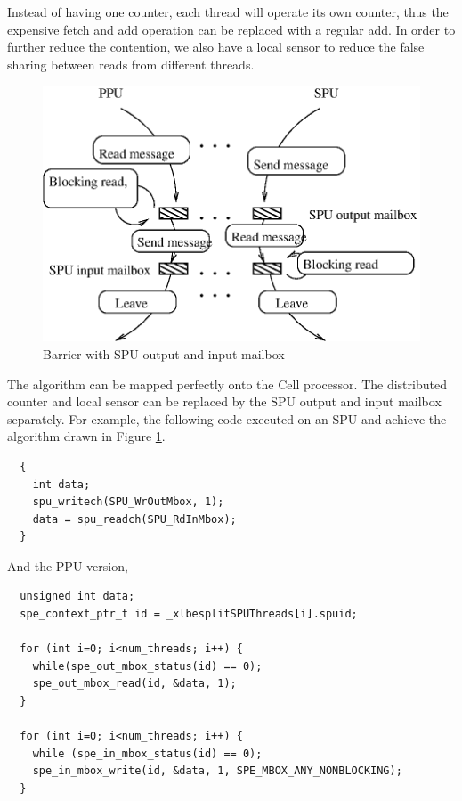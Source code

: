 Instead of having one counter, each thread will operate its own counter, thus
the expensive fetch and add operation can be replaced with a regular
add. In order to further reduce the contention, we also have a local
sensor to reduce the false sharing between reads from different
threads\cite{Zha03}.

\begin{figure}[htbp]
  \begin{center}
    \includegraphics[angle=0, scale=.85]{combined.eps}
    \caption{Barrier with SPU output and input mailbox}
    \label{fig:combined}
  \end{center}
\end{figure}

The algorithm can be mapped perfectly onto the Cell processor. The
distributed counter and local sensor can be replaced by the SPU output and
input mailbox separately. For example, the following code executed on an
SPU and achieve the algorithm drawn in Figure \ref{fig:combined}.

{\small
\begin{verbatim}
  {
    int data;
    spu_writech(SPU_WrOutMbox, 1);
    data = spu_readch(SPU_RdInMbox);
  }
\end{verbatim}
}

And the PPU version,

{\small
\begin{verbatim}
  unsigned int data;
  spe_context_ptr_t id = _xlbesplitSPUThreads[i].spuid;

  for (int i=0; i<num_threads; i++) {
    while(spe_out_mbox_status(id) == 0);
    spe_out_mbox_read(id, &data, 1);
  }

  for (int i=0; i<num_threads; i++) {
    while (spe_in_mbox_status(id) == 0);
    spe_in_mbox_write(id, &data, 1, SPE_MBOX_ANY_NONBLOCKING);
  }
\end{verbatim}
}

